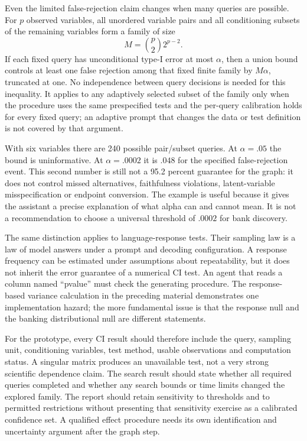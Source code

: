 Even the limited false-rejection claim changes when many queries are possible.
For $p$ observed variables, all unordered variable pairs and all conditioning
subsets of the remaining variables form a family of size
\[
 M=\binom p2 2^{p-2}.
\]
If each fixed query has unconditional type-I error at most $\alpha$, then a
union bound controls at least one false rejection among that fixed finite
family by $M\alpha$, truncated at one. No independence between query decisions
is needed for this inequality. It applies to any adaptively selected subset of
the family only when the procedure uses the same prespecified tests and the
per-query calibration holds for every fixed query; an adaptive prompt that
changes the data or test definition is not covered by that argument.

With six variables there are 240 possible pair/subset queries. At $\alpha=.05$
the bound is uninformative. At $\alpha=.0002$ it is $.048$ for the specified
false-rejection event. This second number is still not a 95.2 percent guarantee
for the graph: it does not control missed alternatives, faithfulness violations,
latent-variable misspecification or endpoint conversion. The example is useful
because it gives the assistant a precise explanation of what alpha can and
cannot mean. It is not a recommendation to choose a universal threshold of
$.0002$ for bank discovery.

The same distinction applies to language-response tests. Their sampling law is
a law of model answers under a prompt and decoding configuration. A response
frequency can be estimated under assumptions about repeatability, but it does
not inherit the error guarantee of a numerical CI test. An agent that reads a
column named ``pvalue'' must check the generating procedure. The response-based
variance calculation in the preceding material demonstrates one implementation
hazard; the more fundamental issue is that the response null and the banking
distributional null are different statements.

For the prototype, every CI result should therefore include the query, sampling
unit, conditioning variables, test method, usable observations and computation
status. A singular matrix produces an unavailable test, not a very strong
scientific dependence claim. The search result should state whether all
required queries completed and whether any search bounds or time limits
changed the explored family. The report should retain sensitivity to thresholds
and to permitted restrictions without presenting that sensitivity exercise as
a calibrated confidence set. A qualified effect procedure needs its own
identification and uncertainty argument after the graph step.

